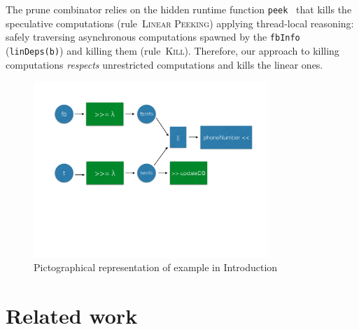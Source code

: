 \documentclass[sigplan]{acmart}
\begin{document}
\normalsize
The prune combinator relies on the hidden runtime
function \verb|peek|~\cite{DBLP:conf/coordination/Fernandez-Reyes16}
that kills the speculative computations (rule~\textsc{Linear Peeking})
applying thread-local reasoning: safely traversing asynchronous computations
spawned by the \verb|fbInfo| (\verb|linDeps(b)|) and killing them (rule~\textsc{Kill}).
Therefore, our approach to killing computations \emph{respects} unrestricted computations
and kills the linear ones.

\begin{figure}[t]
\includegraphics[page=3,width=3.5in,trim=0 11cm 0cm 3.3cm,clip=true]{img/dependency}
\caption{\label{fig:ex}Pictographical representation of example in Introduction}
\end{figure}

\section{Related work}
\end{document}
